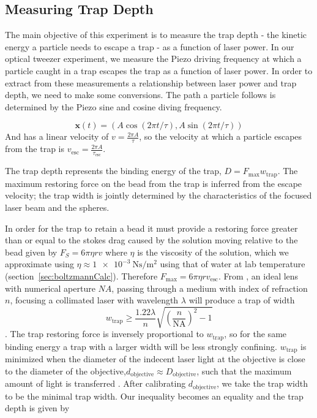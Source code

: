 \documentclass[aps,prb,twocolumn,superscriptaddress,floatfix,longbibliography,citeautoscript]{revtex4-2}
\begin{document}
\subsection{Measuring Trap Depth \label{sec:trapDepth}}
The main objective of this experiment is to measure the trap depth - the kinetic energy a particle needs to escape a trap - as a function of laser power. In our optical tweezer experiment, we measure the Piezo driving frequency at which a particle caught in a trap escapes the trap as a function of laser power. In order to extract from these measurements a relationship between laser power and trap depth, we need to make some conversions. 
The path a particle follows is determined by the Piezo sine and cosine diving frequency. 

$$\boldsymbol{x}(t) = \left(A\cos(2\pi t /\tau), A\sin(2\pi t/\tau)\right)$$
And has a linear velocity of $v = \frac{2\pi A}{\tau}$, so the velocity at which a particle escapes from the trap is $v_{\text{esc}} = \frac{2\pi A}{\tau_{\text{esc}}}$.

The trap depth represents the binding energy of the trap, $D = F_{\text{max}}w_{\text{trap}}$. The maximum restoring force on the bead from the trap is inferred from the escape velocity; the trap width is jointly determined by the characteristics of the focused laser beam and the spheres.

In order for the trap to retain a bead it must provide a restoring force greater than or equal to the stokes drag caused by the solution moving relative to the bead given by $F_{S} = 6 \pi \eta r v$ where $\eta$ is the viscosity of the solution, which we approximate using $\eta\approx \SI{1e-3}{\newton\second\per\meter^2}$ using that of water at lab temperature (section~\ref{sec:boltzmannCalc}). 
Therefore $F_{\text{max}} = 6 \pi \eta r v_{\text{esc}}$. 
From \cite{Smith1999AJP}, an ideal lens with numerical aperture $NA$, passing through a medium with index of refraction $n$, focusing a collimated laser with wavelength $\lambda$ will produce a trap of width
$$w_{\text{trap}} \geq \frac{1.22 \lambda}{n} \sqrt{\left( \frac{n}{\text{NA}} \right)^2 - 1}$$. The trap restoring force is inversely proportional to $w_{\text{trap}}$, so for the same binding energy a trap with a larger width will be less strongly confining. $w_{\text{trap}}$ is minimized when the diameter of the indecent laser light at the objective is close to the diameter of the objective,$d_\text{objective} \approx D_\text{objective}$, such that the maximum amount of light is transferred \cite{Smith1999AJP}. After calibrating $d_\text{objective}$, we take the trap width to be the minimal trap width. Our inequality becomes an equality and the trap depth is given by
\end{document}
